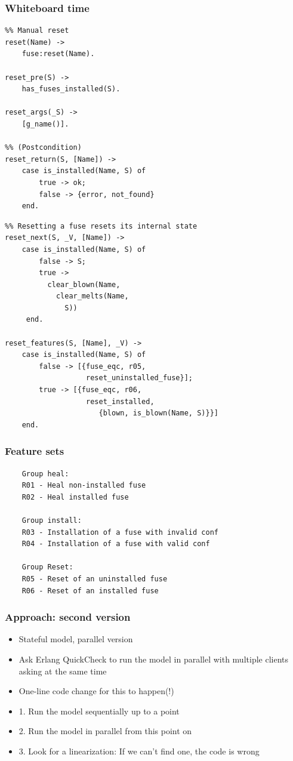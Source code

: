 \documentclass[lualatex]{beamer}
\begin{document}
\begin{frame}
  \frametitle{Whiteboard time}
\end{frame}

\begin{frame}[fragile]
\begin{verbatim}
%% Manual reset
reset(Name) ->
    fuse:reset(Name).

reset_pre(S) ->
    has_fuses_installed(S).

reset_args(_S) ->
    [g_name()].

%% (Postcondition)
reset_return(S, [Name]) ->
    case is_installed(Name, S) of
        true -> ok;
        false -> {error, not_found}
    end.
\end{verbatim}
\end{frame}

\begin{frame}[fragile]
\begin{verbatim}
%% Resetting a fuse resets its internal state
reset_next(S, _V, [Name]) ->
    case is_installed(Name, S) of
        false -> S;
        true ->
          clear_blown(Name,
            clear_melts(Name,
              S))
     end.

reset_features(S, [Name], _V) ->
    case is_installed(Name, S) of
        false -> [{fuse_eqc, r05,
                   reset_uninstalled_fuse}];
        true -> [{fuse_eqc, r06,
                   reset_installed,
                      {blown, is_blown(Name, S)}}]
    end.
\end{verbatim}
\end{frame}

\begin{frame}[fragile]
  \frametitle{Feature sets}
\begin{verbatim}
    Group heal:
    R01 - Heal non-installed fuse
    R02 - Heal installed fuse

    Group install:
    R03 - Installation of a fuse with invalid conf
    R04 - Installation of a fuse with valid conf

    Group Reset:
    R05 - Reset of an uninstalled fuse
    R06 - Reset of an installed fuse
\end{verbatim}
\end{frame}

\begin{frame}
  \frametitle{Approach: second version}
  \begin{itemize}
  \item Stateful model, parallel version
  \item Ask Erlang QuickCheck to run the model in parallel with
    multiple clients asking at the same time
  \item One-line code change for this to happen(!)
  \item 1. Run the model sequentially up to a point
  \item 2. Run the model in parallel from this point on
  \item 3. Look for a linearization: If we can't find one, the code
    is wrong
  \end{itemize}
\end{frame}
\end{document}
